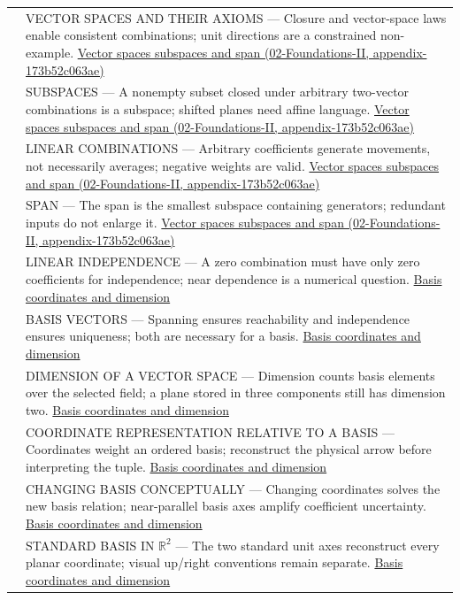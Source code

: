 {\begin{longtable}[]{@{}
  >{\raggedright\arraybackslash}p{}
  >{\raggedright\arraybackslash}p{}@{}}
507 & VECTOR SPACES AND THEIR AXIOMS --- Closure and vector-space laws enable consistent combinations; unit directions are a constrained non-example. \href{../02-Foundations-II/main.pdf\#nameddest=appendix-173b52c063ae}{Vector spaces subspaces and span (02-Foundations-II, appendix-173b52c063ae)} \\
508 & SUBSPACES --- A nonempty subset closed under arbitrary two-vector combinations is a subspace; shifted planes need affine language. \href{../02-Foundations-II/main.pdf\#nameddest=appendix-173b52c063ae}{Vector spaces subspaces and span (02-Foundations-II, appendix-173b52c063ae)} \\
509 & LINEAR COMBINATIONS --- Arbitrary coefficients generate movements, not necessarily averages; negative weights are valid. \href{../02-Foundations-II/main.pdf\#nameddest=appendix-173b52c063ae}{Vector spaces subspaces and span (02-Foundations-II, appendix-173b52c063ae)} \\
510 & SPAN --- The span is the smallest subspace containing generators; redundant inputs do not enlarge it. \href{../02-Foundations-II/main.pdf\#nameddest=appendix-173b52c063ae}{Vector spaces subspaces and span (02-Foundations-II, appendix-173b52c063ae)} \\
511 & LINEAR INDEPENDENCE --- A zero combination must have only zero coefficients for independence; near dependence is a numerical question. \hyperref[appendix-ce0341f7ea0d]{Basis coordinates and dimension} \\
512 & BASIS VECTORS --- Spanning ensures reachability and independence ensures uniqueness; both are necessary for a basis. \hyperref[appendix-ce0341f7ea0d]{Basis coordinates and dimension} \\
513 & DIMENSION OF A VECTOR SPACE --- Dimension counts basis elements over the selected field; a plane stored in three components still has dimension two. \hyperref[appendix-ce0341f7ea0d]{Basis coordinates and dimension} \\
514 & COORDINATE REPRESENTATION RELATIVE TO A BASIS --- Coordinates weight an ordered basis; reconstruct the physical arrow before interpreting the tuple. \hyperref[appendix-ce0341f7ea0d]{Basis coordinates and dimension} \\
515 & CHANGING BASIS CONCEPTUALLY --- Changing coordinates solves the new basis relation; near-parallel basis axes amplify coefficient uncertainty. \hyperref[appendix-ce0341f7ea0d]{Basis coordinates and dimension} \\
516 & STANDARD BASIS IN \(\mathbb R^2\) --- The two standard unit axes reconstruct every planar coordinate; visual up/right conventions remain separate. \hyperref[appendix-ce0341f7ea0d]{Basis coordinates and dimension} \\

\end{longtable}}
